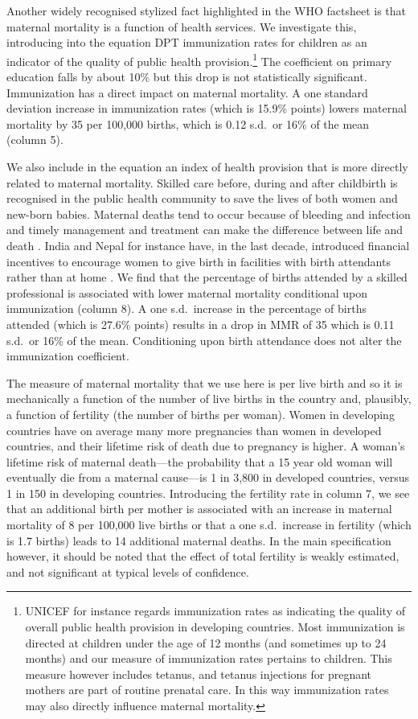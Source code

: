 \documentclass{article}[12pt,subeqn]
\begin{document}
\begin{spacing}{1.4}
Another widely recognised stylized fact highlighted in the WHO factsheet is that 
maternal mortality is a function of health services. We investigate this, 
introducing into the equation DPT immunization rates for children as an indicator 
of the quality of public health provision.\footnote{UNICEF for instance regards 
immunization rates as indicating the quality of overall public health provision 
in developing countries. Most immunization is directed at children under the age 
of 12 months (and sometimes up to 24 months) and our measure of immunization rates 
pertains to children. This measure however includes tetanus, and tetanus
injections for pregnant mothers are part of routine prenatal care. In this way
immunization rates may also directly influence maternal mortality.} The coefficient
on primary education falls by about 10\% but this drop is not statistically 
significant. Immunization has a direct impact on maternal mortality. A one 
standard deviation increase in immunization rates (which is 15.9\% points) lowers 
maternal mortality by 35 per 100,000 births, which is 0.12 s.d.\ or 16\% of the 
mean (column 5).

We also include in the equation an index of health provision that is more 
directly related to maternal mortality. Skilled care before, during and after 
childbirth is recognised in the public health community to save the lives of both 
women and new-born babies. Maternal deaths tend to occur because of bleeding and
infection and timely management and treatment can make the difference between life 
and death \citep{WHO2012}. India and Nepal for instance have, in the last decade, 
introduced financial incentives to encourage women to give birth in facilities 
with birth attendants rather than at home \citep{Milleretal2012,
PowellJacksonHanson2012}. We find that the percentage of births attended by a 
skilled professional is associated with lower maternal mortality conditional upon 
immunization (column 8). A one s.d.\ increase in the percentage of births attended 
(which is 27.6\% points) results in a drop in MMR of 35 which is 0.11 s.d.\ or 16\% 
of the mean. Conditioning upon birth attendance does not alter the immunization 
coefficient.

The measure of maternal mortality that we use here is per live birth and so it is 
mechanically a function of the number of live births in the country and, plausibly, 
a function of fertility (the number of births per woman). Women in developing 
countries have on average many more pregnancies than women in developed countries, 
and their lifetime risk of death due to pregnancy is higher. A woman's lifetime 
risk of maternal death---the probability that a 15 year old woman will eventually 
die from a maternal cause---is 1 in 3,800 in developed countries, versus 1 in 150 
in developing countries. Introducing the fertility rate in column 7, we see that an 
additional birth per mother is associated with an increase in maternal mortality of
8 per 100,000 live births or that a one s.d.\ increase in fertility (which is 1.7
births) leads to 14 additional maternal deaths. In the main specification however,
it should be noted that the effect of total fertility is weakly estimated, and not
significant at typical levels of confidence.


\end{spacing}
\end{document}
